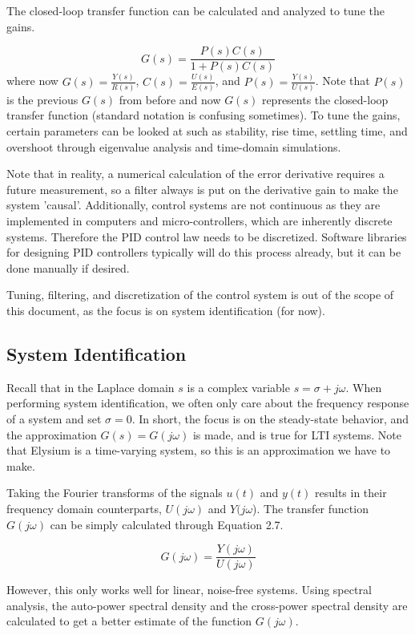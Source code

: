 \documentclass{article}
\begin{document}
The closed-loop transfer function can be calculated and analyzed to tune the gains. 

\begin{equation}
    G(s)=\frac{P(s)C(s)}{1+P(s)C(s)}
\end{equation}
where now $G(s)=\frac{Y(s)}{R(s)}$, $C(s)=\frac{U(s)}{E(s)}$, and $P(s)=\frac{Y(s)}{U(s)}$. Note that $P(s)$ is the previous $G(s)$ from before and now $G(s)$ represents the closed-loop transfer function (standard notation is confusing sometimes).
 To tune the gains, certain parameters can be looked at such as stability, rise time, settling time, and overshoot through eigenvalue analysis and time-domain simulations. 

Note that in reality, a numerical calculation of the error derivative requires a future measurement, so a filter always is put on the derivative gain to make the system 'causal'. Additionally, control systems are not continuous as they are implemented in computers and micro-controllers, which are inherently discrete systems. Therefore the PID control law needs to be discretized. Software libraries for designing PID controllers typically will do this process already, but it can be done manually if desired.

Tuning, filtering, and discretization of the control system is out of the scope of this document, as the focus is on system identification (for now).

\subsection{System Identification}
Recall that in the Laplace domain $s$ is a complex variable $s=\sigma+j\omega$. When performing system identification, we often only care about the frequency response of a system and set $\sigma=0$. In short, the focus is on the steady-state behavior, and the approximation $G(s)=G(j\omega)$ is made, and is true for LTI systems. Note that Elysium is a time-varying system, so this is an approximation we have to make.

Taking the Fourier transforms of the signals $u(t)$ and $y(t)$ results in their frequency domain counterparts, $U(j\omega)$ and $Y(j\omega$). The transfer function $G(j\omega)$ can be simply calculated through Equation 2.7. 

\begin{equation}
    G(j\omega)=\frac{Y(j\omega)}{U(j\omega)}
\end{equation}

However, this only works well for linear, noise-free systems. Using spectral analysis, the auto-power spectral density and the cross-power spectral density are calculated to get a better estimate of the function $G(j\omega)$.
\end{document}
